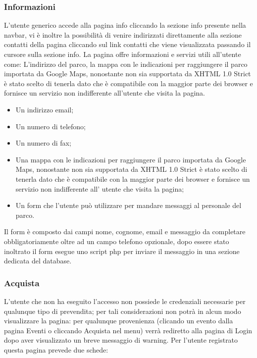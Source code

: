             \subsubsection{Informazioni}
            L’utente generico accede alla pagina info cliccando la sezione info presente nella navbar, vi è inoltre la possibilità di venire indirizzati direttamente alla sezione contatti della pagina cliccando sul link contatti che viene visualizzata passando il cursore sulla sezione info. La pagina offre informazioni e servizi utili all’utente come:
            L’indirizzo del parco, la mappa con le indicazioni per raggiungere il parco importata da Google Maps, nonostante non sia supportata da XHTML 1.0 Strict è stato scelto di tenerla dato che è compatibile con la maggior parte dei browser e fornisce un servizio non indifferente all’utente che visita la pagina.
            \begin{itemize}
                \item Un indirizzo email;
                \item Un numero di telefono;
                \item Un numero di fax;
                \item Una mappa con le indicazioni per raggiungere il parco importata da Google Maps, nonostante non sia supportata da XHTML 1.0 Strict è stato scelto di tenerla dato che è compatibile con la maggior parte dei browser e fornisce un servizio non indifferente all’ utente che visita la pagina;
                \item Un form che l’utente può utilizzare per mandare messaggi al personale del parco.
            \end{itemize}
            Il form è composto dai campi nome, cognome, email e messaggio da completare obbligatoriamente oltre ad un campo telefono opzionale, dopo essere stato inoltrato il form esegue uno script php per inviare il messaggio in una sezione dedicata del database.

        \subsubsection{Acquista}
            L'utente che non ha eseguito l'accesso non possiede le credenziali necessarie per qualunque tipo di prevendita; per tali considerazioni non potrà in alcun modo visualizzare la pagina: per qualunque provenienza (clicando un evento dalla pagina Eventi o cliccando Acquista nel menu) verrà rediretto alla pagina di Login dopo aver visualizzato un breve messaggio di warning.
            Per l'utente registrato questa pagina prevede due schede:
